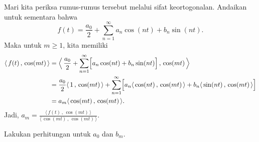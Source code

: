 Mari kita periksa rumus-rumus tersebut melalui sifat keortogonalan.  Andaikan untuk
sementara bahwa
\begin{equation*}
f(t) = \frac{a_0}{2} + \sum_{n=1}^\infty a_n \cos (n t) + b_n
\sin (n t) .
\end{equation*}
Maka untuk $m \geq 1$, kita memiliki
\begin{equation*}
\begin{split}
\langle \, f(t)\,,\,\cos (mt) \, \rangle
& =
\Bigl\langle \, \frac{a_0}{2} + \sum_{n=1}^\infty
\Bigl[
a_n \cos (n t) + b_n \sin (n t)
\Bigr]
\,,\, \cos (mt) \, \Bigr\rangle \\
& =
\frac{a_0}{2}
\langle \, 1 \, , \, \cos (mt) \, \rangle
+
\sum_{n=1}^\infty
\Bigl[
a_n \langle \, \cos (nt) \, , \, \cos (mt) \, \rangle +
b_n \langle \, \sin (n t) \, , \, \cos (mt) \, \rangle
\Bigr]
\\
& =
a_m \langle \, \cos (mt) \, , \, \cos (mt) \, \rangle .
\end{split}
\end{equation*}
Jadi,
$a_m =
\frac{\langle \, f(t) \, , \, \cos (mt) \, \rangle}{\langle \, \cos (mt) \, , \,
\cos (mt) \, \rangle}$.

\begin{exercise}
Lakukan perhitungan untuk $a_0$ dan $b_m$.
\end{exercise}

